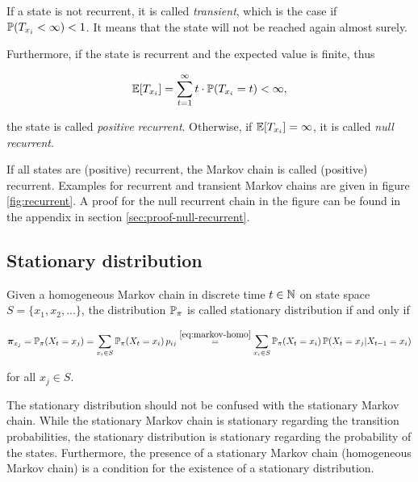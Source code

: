 If a state is not recurrent, it is called \emph{transient}, which is the case if $\mathbb{P}(T_{x_i} < \infty) < 1$. It means that the state will not be reached again almost surely.

Furthermore, if the state is recurrent and the expected value is finite, thus

\begin{equation}
\label{eq:first-comeback-expect}
\mathbb{E}[T_{x_i}] = \sum_{t=1}^\infty t \cdot \mathbb{P}(T_{x_i} = t) < \infty,
\end{equation}

the state is called \emph{positive recurrent}. Otherwise, if $\mathbb{E}[T_{x_i}] = \infty$, it is called \emph{null recurrent}.

If all states are (positive) recurrent, the Markov chain is called (positive) recurrent. Examples for recurrent and transient Markov chains are given in figure \ref{fig:recurrent}. A proof for the null recurrent chain in the figure can be found in the appendix in section \ref{sec:proof-null-recurrent}.

\subsection{Stationary distribution}
\label{sec:stat-markov}


\begin{definition}

Given a homogeneous Markov chain in discrete time $t \in \mathbb{N}$ on state space $S = \{x_1, x_2, ...\}$, the distribution $\mathbb{P}_\pi$ is called stationary distribution if and only if

\begin{equation}
\label{eq:markov-stat}
\bm\pi_{x_j} = \mathbb{P}_\pi(X_t = x_j) = \sum_{x_i \in S} \mathbb{P}_\pi(X_t = x_i)\,p_{ij} \overset{\eqref{eq:markov-homo}}{=} \sum_{x_i \in S} \mathbb{P}_\pi(X_t = x_i)\,\mathbb{P}(X_t = x_j | X_{t-1} = x_i)
\end{equation}

for all $x_j \in S$.
\end{definition}


The stationary distribution should not be confused with the stationary Markov chain. While the stationary Markov chain is stationary regarding the transition probabilities, the stationary distribution is stationary regarding the probability of the states. Furthermore, the presence of a stationary Markov chain (homogeneous Markov chain) is a condition for the existence of a stationary distribution.

